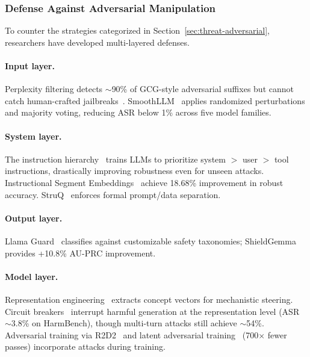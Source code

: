 \subsubsection{Defense Against Adversarial Manipulation}
\label{sec:defense}

To counter the strategies categorized in Section~\ref{sec:threat-adversarial}, researchers have developed multi-layered defenses.

\paragraph{Input layer.}
Perplexity filtering detects $\sim$90\% of GCG-style adversarial suffixes but cannot catch human-crafted jailbreaks~\cite{alon2023perplexity}. SmoothLLM~\cite{robey2023smoothllm} applies randomized perturbations and majority voting, reducing ASR below 1\% across five model families.

\paragraph{System layer.}
The instruction hierarchy~\cite{wallace2024hierarchy} trains LLMs to prioritize system $>$ user $>$ tool instructions, drastically improving robustness even for unseen attacks. Instructional Segment Embeddings~\cite{wu2025ise} achieve 18.68\% improvement in robust accuracy. StruQ~\cite{chen2025struq} enforces formal prompt/data separation.

\paragraph{Output layer.}
Llama Guard~\cite{inan2023llamaguard} classifies against customizable safety taxonomies; ShieldGemma~\cite{zeng2024shieldgemma} provides +10.8\% AU-PRC improvement.

\paragraph{Model layer.}
Representation engineering~\cite{zou2023repe} extracts concept vectors for mechanistic steering. Circuit breakers~\cite{zou2024circuitbreakers} interrupt harmful generation at the representation level (ASR $\sim$3.8\% on HarmBench), though multi-turn attacks still achieve $\sim$54\%. Adversarial training via R2D2~\cite{mazeika2024harmbench} and latent adversarial training~\cite{sheshadri2024lat} (700$\times$ fewer passes) incorporate attacks during training.


